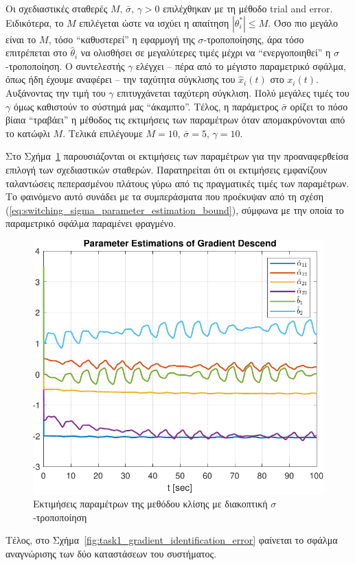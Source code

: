 \documentclass[a4paper,12pt]{article}
\begin{document}
Οι σχεδιαστικές σταθερές $M, \, \bar{\sigma}, \, \gamma > 0$ επιλέχθηκαν με τη μέθοδο
trial and error.
Ειδικότερα, το $M$ επιλέγεται ώστε να ισχύει η απαίτηση $|\theta_i^*| \leq M$. Όσο πιο μεγάλο είναι το $M$,
τόσο ``καθυστερεί'' η εφαρμογή της $\sigma$-τροποποίησης, άρα τόσο επιτρέπεται στο $\hat{\theta}_i$ να ολισθήσει
σε μεγαλύτερες τιμές μέχρι να ``ενεργοποιηθεί'' η $\sigma$-τροποποίηση. Ο συντελεστής $\gamma$ ελέγχει 
-- πέρα από το μέγιστο παραμετρικό σφάλμα, όπως ήδη έχουμε αναφέρει -- την ταχύτητα σύγκλισης του 
$\hat{x}_i(t)$ στο $x_i(t)$. Αυξάνοντας την τιμή του $\gamma$ επιτυγχάνεται ταχύτερη σύγκλιση. Πολύ μεγάλες 
τιμές του $\gamma$ όμως καθιστούν το σύστημά μας ``άκαμπτο''. Τέλος, η παράμετρος $\bar{\sigma}$ ορίζει το 
πόσο βίαια ``τραβάει'' η μέθοδος τις εκτιμήσεις των παραμέτρων όταν απομακρύνονται από το κατώφλι $M$. Τελικά
επιλέγουμε $M = 10, \, \bar{\sigma} = 5, \, \gamma = 10$.

Στο Σχήμα~\ref{fig:task1_gradient_parameter_estimations} παρουσιάζονται οι εκτιμήσεις των παραμέτρων για 
την προαναφερθείσα επιλογή των σχεδιαστικών σταθερών. Παρατηρείται ότι οι εκτιμήσεις εμφανίζουν ταλαντώσεις
πεπερασμένου πλάτους γύρω από τις πραγματικές τιμές των παραμέτρων. Το φαινόμενο αυτό συνάδει με τα 
συμπεράσματα που προέκυψαν από τη σχέση (\ref{eq:switching_sigma_parameter_estimation_bound}), σύμφωνα με 
την οποία το παραμετρικό σφάλμα παραμένει φραγμένο.

\begin{figure}
    \centering
    \includegraphics[width=0.5\linewidth]{plot/task1_gradient_parameter_estimations.pdf}
    \caption{Εκτιμήσεις παραμέτρων της μεθόδου κλίσης με διακοπτική $\sigma$-τροποποίηση}
    \label{fig:task1_gradient_parameter_estimations}
\end{figure}

Τέλος, στο Σχήμα~\ref{fig:task1_gradient_identification_error} φαίνεται το σφάλμα αναγνώρισης των δύο 
καταστάσεων του συστήματος.
\end{document}
